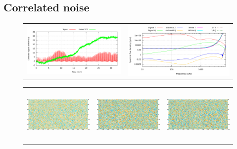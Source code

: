 \documentclass{article}
\begin{document}
\subsection{Correlated noise}
\begin{figure}
	\centering
	\hspace*{-7mm}\begin{tabular}{m{75mm}m{75mm}}
		\vspace*{2.0mm}\includegraphics[width=79mm]{plots/noise_oof_example.pdf} &
			\includegraphics[width=85mm]{plots/noise_abs_log_log_wide.pdf}
	\end{tabular}
	\hspace*{-5mm}\begin{tabular}{m{56mm}m{54.4mm}m{56mm}}
		\includegraphics[height=28mm,clip,trim=0 8mm 7.5mm 0]{plots/noise_oof_sb_map_0.png} &
		\includegraphics[height=28mm,clip,trim=7.5mm 8mm 7.5mm 0]{plots/noise_oof_sb_map_1.png} &
		\includegraphics[height=28mm,clip,trim=7.5mm 8mm 0 0]{plots/noise_oof_sb_map_2.png} \\

\end{tabular}
\end{figure}
\end{document}

